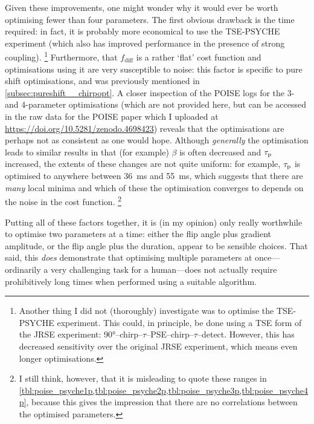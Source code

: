 Given these improvements, one might wonder why it would ever be worth optimising fewer than four parameters.
The first obvious drawback is the time required: in fact, it is probably more economical to use the TSE-PSYCHE experiment (which also has improved performance in the presence of strong coupling).%
\footnote{Another thing I did not (thoroughly) investigate was to optimise the TSE-PSYCHE experiment. This could, in principle, be done using a TSE form of the JRSE experiment: \ang{90}--chirp--$\tau$--PSE--chirp--$\tau$--detect. However, this has decreased sensitivity over the original JRSE experiment, which means even longer optimisations.}
Furthermore, that $f_\text{diff}$ is a rather `flat' cost function and optimisations using it are very susceptible to noise: this factor is specific to pure shift optimisations, and was previously mentioned in \cref{subsec:pureshift__chirpopt}.
A closer inspection of the POISE logs for the 3- and 4-parameter optimisations (which are not provided here, but can be accessed in the raw data for the POISE paper which I uploaded at \url{https://doi.org/10.5281/zenodo.4698423}) reveals that the optimisations are perhaps not as consistent as one would hope.
Although \textit{generally} the optimisation leads to similar results in that (for example) $\beta$ is often decreased and $\tau_\mathrm{p}$ increased, the extents of these changes are not quite uniform: for example, $\tau_\mathrm{p}$ is optimised to anywhere between \qty{36}{\ms} and \qty{55}{\ms}, which suggests that there are \textit{many} local minima and which of these the optimisation converges to depends on the noise in the cost function.%
\footnote{I still think, however, that it is misleading to quote these ranges in \cref{tbl:poise_psyche1p,tbl:poise_psyche2p,tbl:poise_psyche3p,tbl:poise_psyche4p}, because this gives the impression that there are no correlations between the optimised parameters.}

Putting all of these factors together, it is (in my opinion) only really worthwhile to optimise two parameters at a time: either the flip angle plus gradient amplitude, or the flip angle plus the duration, appear to be sensible choices.
That said, this \textit{does} demonstrate that optimising multiple parameters at once---ordinarily a very challenging task for a human---does not actually require prohibitively long times when performed using a suitable algorithm.

